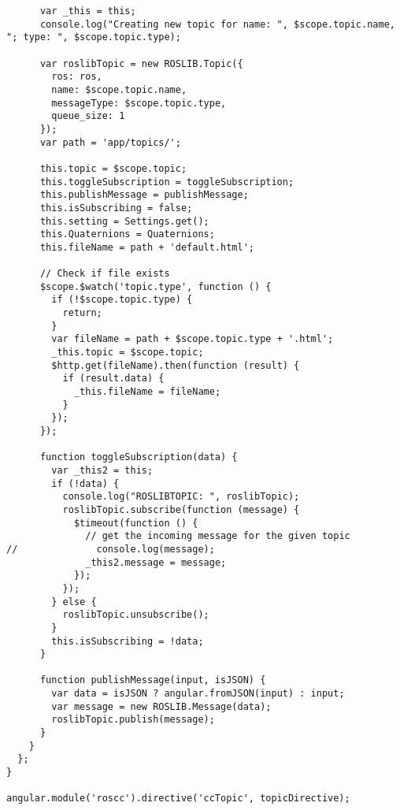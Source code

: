 \begin{verbatim}
      var _this = this;
      console.log("Creating new topic for name: ", $scope.topic.name, "; type: ", $scope.topic.type);

      var roslibTopic = new ROSLIB.Topic({
        ros: ros,
        name: $scope.topic.name,
        messageType: $scope.topic.type,
        queue_size: 1
      });
      var path = 'app/topics/';

      this.topic = $scope.topic;
      this.toggleSubscription = toggleSubscription;
      this.publishMessage = publishMessage;
      this.isSubscribing = false;
      this.setting = Settings.get();
      this.Quaternions = Quaternions;
      this.fileName = path + 'default.html';

      // Check if file exists
      $scope.$watch('topic.type', function () {
        if (!$scope.topic.type) {
          return;
        }
        var fileName = path + $scope.topic.type + '.html';
        _this.topic = $scope.topic;
        $http.get(fileName).then(function (result) {
          if (result.data) {
            _this.fileName = fileName;
          }
        });
      });

      function toggleSubscription(data) {
        var _this2 = this;
        if (!data) {
          console.log("ROSLIBTOPIC: ", roslibTopic);
          roslibTopic.subscribe(function (message) {
            $timeout(function () {
              // get the incoming message for the given topic
//              console.log(message);
              _this2.message = message;
            });
          });
        } else {
          roslibTopic.unsubscribe();
        }
        this.isSubscribing = !data;
      }

      function publishMessage(input, isJSON) {
        var data = isJSON ? angular.fromJSON(input) : input;
        var message = new ROSLIB.Message(data);
        roslibTopic.publish(message);
      }
    }
  };
}

angular.module('roscc').directive('ccTopic', topicDirective);



\end{verbatim}
